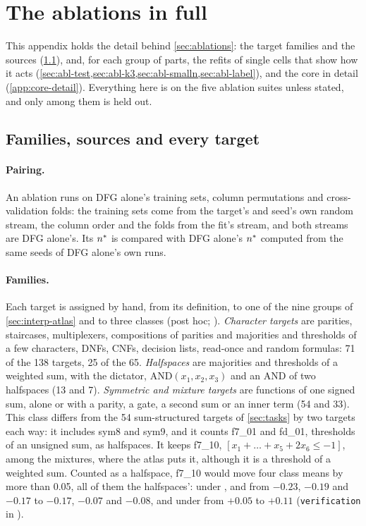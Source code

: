 \clearpage
\section{The ablations in full}\label{app:abl-detail}

This appendix holds the detail behind \cref{sec:ablations}: the target families and the sources (\cref{app:abl-families}), and, for each group of parts, the refits of single cells that show how it acts (\cref{sec:abl-test,sec:abl-k3,sec:abl-smalln,sec:abl-label}), and the core in detail (\cref{app:core-detail}). Everything here is on the five ablation suites unless stated, and only  among them is held out.

\subsection{Families, sources and every target}\label{app:abl-families}

\paragraph{Pairing.} An ablation runs on DFG alone's training sets, column permutations and cross-validation folds: the training sets come from the target's and seed's own random stream, the column order and the folds from the fit's stream, and both streams are DFG alone's. Its $n^{*}$ is compared with DFG alone's $n^{*}$ computed from the same seeds of DFG alone's own runs.

\paragraph{Families.} Each target is assigned by hand, from its definition, to one of the nine groups of \cref{sec:interp-atlas} and to three classes (post hoc; ). \emph{Character targets} are parities, staircases, multiplexers, compositions of parities and majorities and thresholds of a few characters, DNFs, CNFs, decision lists, read-once and random formulas: 71 of the 138 targets, 25 of the 65. \emph{Halfspaces} are majorities and thresholds of a weighted sum, with the dictator, $\mathrm{AND}(x_1,x_2,x_3)$ and an AND of two halfspaces (13 and 7). \emph{Symmetric and mixture targets} are functions of one signed sum, alone or with a parity, a gate, a second sum or an inner term (54 and 33). This class differs from the 54 sum-structured targets of \cref{sec:tasks} by two targets each way: it includes sym8 and sym9, and it counts f7\_01 and fd\_01, thresholds of an unsigned sum, as halfspaces. It keeps f7\_10, $[x_1+\dots+x_5+2x_6\le-1]$, among the mixtures, where the atlas puts it, although it is a threshold of a weighted sum. Counted as a halfspace, f7\_10 would move four class means by more than 0.05, all of them the halfspaces': under ,  and  from $-0.23$, $-0.19$ and $-0.17$ to $-0.17$, $-0.07$ and $-0.08$, and under  from $+0.05$ to $+0.11$ (\texttt{verification} in ).

